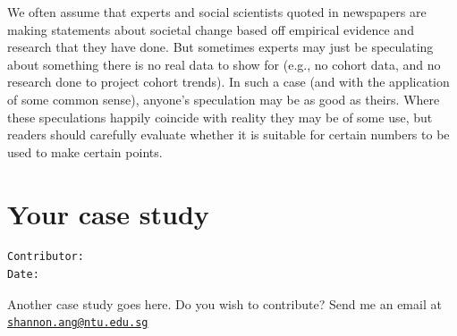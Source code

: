 \documentclass[openany]{book}
\begin{document}
We often assume that experts and social scientists quoted in newspapers
are making statements about societal change based off empirical evidence
and research that they have done. But sometimes experts may just be
speculating about something there is no real data to show for (e.g., no
cohort data, and no research done to project cohort trends). In such a
case (and with the application of some common sense), anyone's
speculation may be as good as theirs. Where these speculations happily
coincide with reality they may be of some use, but readers should
carefully evaluate whether it is suitable for certain numbers to be used
to make certain points.

\chapter{Your case study}\label{case3}

\begin{verbatim}
Contributor: 
Date: 
\end{verbatim}

Another case study goes here. Do you wish to contribute? Send me an
email at
\href{mailto:shannon.ang@ntu.edu.sg}{\nolinkurl{shannon.ang@ntu.edu.sg}}


\end{document}

